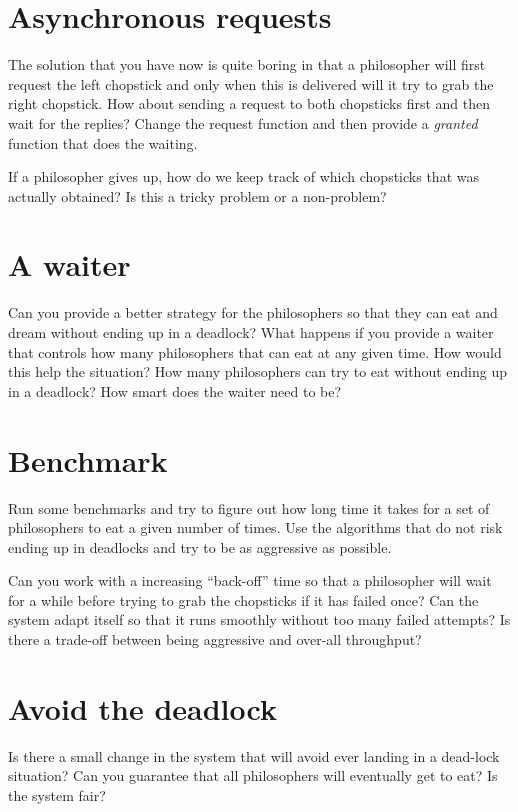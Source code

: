 \documentclass[a4paper,11pt]{article}
\begin{document}

\section{Asynchronous requests}

The solution that you have now is quite boring in that a philosopher
will first request the left chopstick and only when this is delivered
will it try to grab the right chopstick. How about sending a request
to both chopsticks first and then wait for the replies? Change the
request function and then provide a {\em granted} function that does
the waiting. 

If a philosopher gives up, how do we keep track of which chopsticks
that was actually obtained? Is this a tricky problem or a non-problem?



\section{A waiter}

Can you provide a better strategy for the philosophers so that they
can eat and dream without ending up in a deadlock? What happens if
you provide a waiter that controls how many philosophers that can eat
at any given time. How would this help the situation? How many
philosophers can try to eat without ending up in a deadlock? How
smart does the waiter need to be?



\section{Benchmark}

Run some benchmarks and try to figure out how long time it takes for a
set of philosophers to eat a given number of times. Use the algorithms
that do not risk ending up in deadlocks and try to be as aggressive as
possible.  

Can you work with a increasing ``back-off'' time so that a philosopher
will wait for a while before trying to grab the chopsticks if it has
failed once? Can the system adapt itself so that it runs smoothly
without too many failed attempts? Is there a trade-off between being
aggressive and over-all throughput?



\section{Avoid the deadlock}

Is there a small change in the system that will avoid ever landing in
a dead-lock situation? Can you guarantee that all philosophers will
eventually get to eat? Is the system fair?
\end{document}
